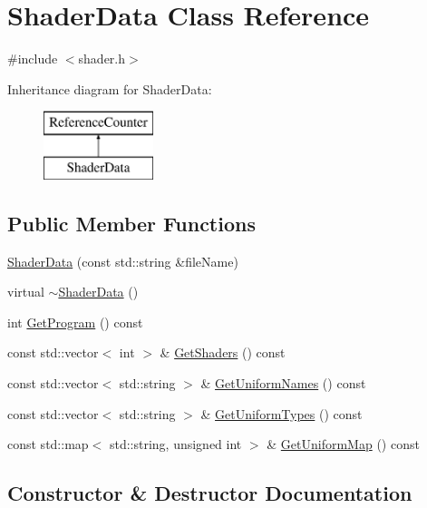 \hypertarget{class_shader_data}{}\section{Shader\+Data Class Reference}
\label{class_shader_data}


{\ttfamily \#include $<$shader.\+h$>$}

Inheritance diagram for Shader\+Data\+:\begin{figure}[H]
\begin{center}
\leavevmode
\includegraphics[height=2.000000cm]{class_shader_data}
\end{center}
\end{figure}
\subsection*{Public Member Functions}
\begin{DoxyCompactItemize}
\item 
\hyperlink{class_shader_data_a635def1584d9fbf143b1ee5941a72cf0}{Shader\+Data} (const std\+::string \&file\+Name)
\item 
virtual \hyperlink{class_shader_data_a592e57f2fd0606dbaafae02219d627e2}{$\sim$\+Shader\+Data} ()
\item 
int \hyperlink{class_shader_data_aadcda4012ddfa9278578b5dff9c7f319}{Get\+Program} () const 
\item 
const std\+::vector$<$ int $>$ \& \hyperlink{class_shader_data_addf621db43c86044b38cd2ec404f35dc}{Get\+Shaders} () const 
\item 
const std\+::vector$<$ std\+::string $>$ \& \hyperlink{class_shader_data_a85e13a7e25b6aa859f3e8bda3044422f}{Get\+Uniform\+Names} () const 
\item 
const std\+::vector$<$ std\+::string $>$ \& \hyperlink{class_shader_data_a9f61726bac2a582284fc5f3b9b676af1}{Get\+Uniform\+Types} () const 
\item 
const std\+::map$<$ std\+::string, unsigned int $>$ \& \hyperlink{class_shader_data_a6cde21590e0894121dc02bc50a01f467}{Get\+Uniform\+Map} () const 
\end{DoxyCompactItemize}


\subsection{Constructor \& Destructor Documentation}
\hypertarget{class_shader_data_a635def1584d9fbf143b1ee5941a72cf0}{}
